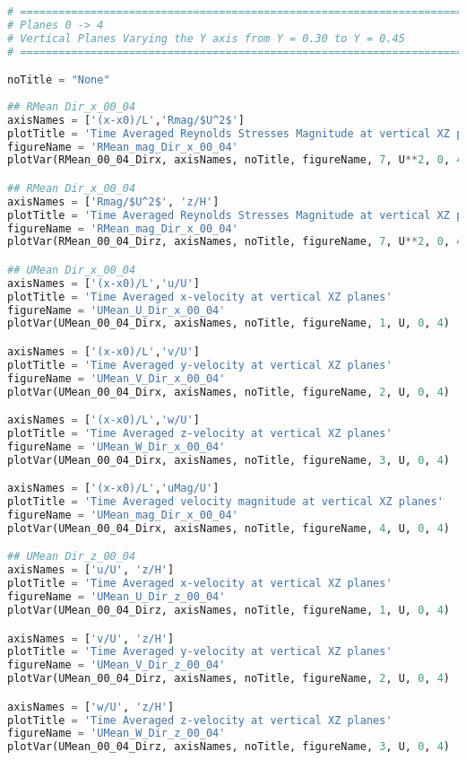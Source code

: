 \begin{lstlisting}[language=python]
# =============================================================================
# Planes 0 -> 4
# Vertical Planes Varying the Y axis from Y = 0.30 to Y = 0.45
# =============================================================================

noTitle = "None"
    
## RMean Dir_x_00_04
axisNames = ['(x-x0)/L','Rmag/$U^2$']
plotTitle = 'Time Averaged Reynolds Stresses Magnitude at vertical XZ planes'
figureName = 'RMean_mag_Dir_x_00_04'
plotVar(RMean_00_04_Dirx, axisNames, noTitle, figureName, 7, U**2, 0, 4)

## RMean Dir_x_00_04
axisNames = ['Rmag/$U^2$', 'z/H']
plotTitle = 'Time Averaged Reynolds Stresses Magnitude at vertical XZ planes'
figureName = 'RMean_mag_Dir_x_00_04'
plotVar(RMean_00_04_Dirz, axisNames, noTitle, figureName, 7, U**2, 0, 4)

## UMean Dir_x_00_04
axisNames = ['(x-x0)/L','u/U']
plotTitle = 'Time Averaged x-velocity at vertical XZ planes'
figureName = 'UMean_U_Dir_x_00_04'
plotVar(UMean_00_04_Dirx, axisNames, noTitle, figureName, 1, U, 0, 4)

axisNames = ['(x-x0)/L','v/U']
plotTitle = 'Time Averaged y-velocity at vertical XZ planes'
figureName = 'UMean_V_Dir_x_00_04'
plotVar(UMean_00_04_Dirx, axisNames, noTitle, figureName, 2, U, 0, 4)

axisNames = ['(x-x0)/L','w/U']
plotTitle = 'Time Averaged z-velocity at vertical XZ planes'
figureName = 'UMean_W_Dir_x_00_04'
plotVar(UMean_00_04_Dirx, axisNames, noTitle, figureName, 3, U, 0, 4)

axisNames = ['(x-x0)/L','uMag/U']
plotTitle = 'Time Averaged velocity magnitude at vertical XZ planes'
figureName = 'UMean_mag_Dir_x_00_04'
plotVar(UMean_00_04_Dirx, axisNames, noTitle, figureName, 4, U, 0, 4)

## UMean Dir_z_00_04
axisNames = ['u/U', 'z/H']
plotTitle = 'Time Averaged x-velocity at vertical XZ planes'
figureName = 'UMean_U_Dir_z_00_04'
plotVar(UMean_00_04_Dirz, axisNames, noTitle, figureName, 1, U, 0, 4)

axisNames = ['v/U', 'z/H']
plotTitle = 'Time Averaged y-velocity at vertical XZ planes'
figureName = 'UMean_V_Dir_z_00_04'
plotVar(UMean_00_04_Dirz, axisNames, noTitle, figureName, 2, U, 0, 4)

axisNames = ['w/U', 'z/H']
plotTitle = 'Time Averaged z-velocity at vertical XZ planes'
figureName = 'UMean_W_Dir_z_00_04'
plotVar(UMean_00_04_Dirz, axisNames, noTitle, figureName, 3, U, 0, 4)


\end{lstlisting}
